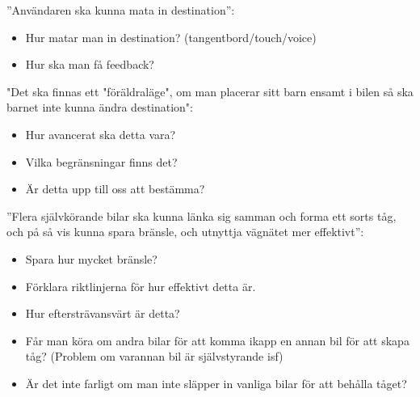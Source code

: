 \documentclass[10pt]{article}
\begin{document}
\noindent ”Användaren ska kunna mata in destination”:
\begin{itemize}
\item Hur matar man in destination? (tangentbord/touch/voice)
\item Hur ska man få feedback?
\end{itemize}
\hfill \break

\noindent"Det ska finnas ett "föräldraläge", om man placerar sitt barn ensamt i bilen så ska barnet inte kunna ändra destination":
\begin{itemize}
\item Hur avancerat ska detta vara?
\item Vilka begränsningar finns det?
\item Är detta upp till oss att bestämma?
\end{itemize}
\hfill \break

\noindent ”Flera självkörande bilar ska kunna länka sig samman och forma ett sorts tåg, och på så vis kunna spara bränsle, och utnyttja vägnätet mer effektivt”:
\begin{itemize}
\item Spara hur mycket bränsle?
\item Förklara riktlinjerna för hur effektivt detta är.
\item Hur eftersträvansvärt är detta?
\item Får man köra om andra bilar för att komma ikapp en annan bil för att skapa tåg? (Problem om varannan bil är självstyrande isf)
\item Är det inte farligt om man inte släpper in vanliga bilar för att behålla tåget? 
\end{itemize}
\hfill \break
\end{document}
